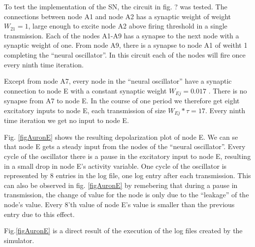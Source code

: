 	To test the implementation of the SN, the circuit in fig. ? %
		was tested. The connections between node A1 and node A2 has a synaptic weight of weight $W_{21}=1$, large enough to excite node A2 above firing threshold in a single transmission.
	Each of the nodes A1-A9 has a synapse to the next node with a synaptic weight of one. 
	From node A9, there is a synapse to node A1 of weitht 1 completing the ``neural oscillator''. In this circuit each of the nodes will fire once every ninth time iteration.

	Except from node A7, every node in the ``neural oscillator'' have a synaptic connection to node E with a constant synaptic weight $W_{Ej}=0.017$ . %
	There is no synapse from A7 to node E.
	In the course of one period we therefore get eight excitatory inputs to node E, each transmission of size $W_{Ej}*\tau = 17$. Every ninth time iteration we get no input to node E.

	Fig. \ref{figAuronE} shows the resulting depolarization plot of node E. 
	We can se that node E gets a steady input from the nodes of the ``neural oscillator''.
	Every cycle of the oscillator there is a pause in the excitatory input to node E, resulting in a small drop in node E's activity variable. 
	One cycle of the oscillator is represented by 8 entries in the log file, one log entry after each transmission.
	This can also be observed in fig. \ref{figAuronE} by remebering that during a pause in transmission, the change of value for the node is only due to the ``leakage'' of the node's value.
	Every 8'th value of node E's value is smaller than the previous entry due to this effect.


	Fig.\ref{figAuronE} is a direct result of the execution of the log files created by the simulator.

